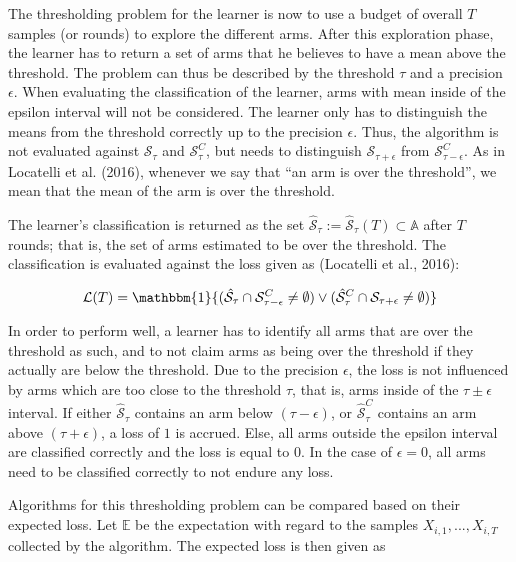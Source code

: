 \documentclass[11pt,]{article}
\begin{document}
The thresholding problem for the learner is now to use a budget of
overall \(T\) samples (or rounds) to explore the different arms. After
this exploration phase, the learner has to return a set of arms that he
believes to have a mean above the threshold. The problem can thus be
described by the threshold \(\tau\) and a precision \(\epsilon\). When
evaluating the classification of the learner, arms with mean inside of
the epsilon interval will not be considered. The learner only has to
distinguish the means from the threshold correctly up to the precision
\(\epsilon\). Thus, the algorithm is not evaluated against
\(\mathcal{S}_{\tau}\) and \(\mathcal{S}^C_{\tau}\), but needs to
distinguish \(\mathcal{S}_{\tau+\epsilon}\) from
\(\mathcal{S}^C_{\tau-\epsilon}\). As in Locatelli et al. (2016),
whenever we say that ``an arm is over the threshold'', we mean that the
mean of the arm is over the threshold.

The learner's classification is returned as the set
\(\hat{\mathcal{S}}_{\tau} := \hat{\mathcal{S}}_{\tau}(T) \subset \mathbb{A}\)
after \(T\) rounds; that is, the set of arms estimated to be over the
threshold. The classification is evaluated against the loss given as
(Locatelli et al., 2016):

\[
\mathcal{L}(T) = \mathbbm{1}{(\hat{\mathcal{S}}_{\tau} \cap \mathcal{S}_{\tau-\epsilon}^C \neq \emptyset) \lor (\hat{\mathcal{S}}_{\tau}^C \cap \mathcal{S}_{\tau+\epsilon} \neq \emptyset)}
\]

In order to perform well, a learner has to identify all arms that are
over the threshold as such, and to not claim arms as being over the
threshold if they actually are below the threshold. Due to the precision
\(\epsilon\), the loss is not influenced by arms which are too close to
the threshold \(\tau\), that is, arms inside of the
\(\tau \pm \epsilon\) interval. If either \(\hat{\mathcal{S}}_{\tau}\)
contains an arm below \((\tau - \epsilon)\), or
\(\hat{\mathcal{S}}^C_{\tau}\) contains an arm above
\((\tau + \epsilon)\), a loss of \(1\) is accrued. Else, all arms
outside the epsilon interval are classified correctly and the loss is
equal to \(0\). In the case of \(\epsilon = 0\), all arms need to be
classified correctly to not endure any loss.

Algorithms for this thresholding problem can be compared based on their
expected loss. Let \(\mathbb{E}\) be the expectation with regard to the
samples \(X_{i,1}, ..., X_{i,T}\) collected by the algorithm. The
expected loss is then given as
\end{document}
